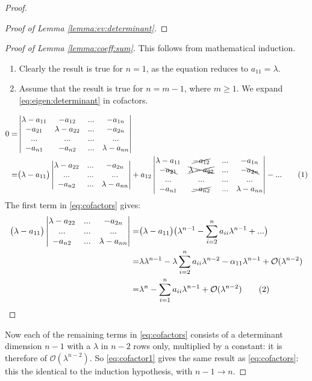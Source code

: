 \documentclass[]{article}
\newcommand\numberthis{\addtocounter{equation}{1}\tag{\theequation}}
\begin{document}
\begin{appendices}
\begin{proof}
\begin{proof}[Proof of Lemma \ref{lemma:ev:determinant}]
		\end{proof}
		\begin{proof}[Proof of Lemma \ref{lemma:coeff:sum}]
			This follows from mathematical induction.
			\begin{enumerate}
				\item Clearly the result is true for $n=1$, as the equation reduces to $a_{11}=\lambda$.
				\item Assume that the result is true for $n=m-1$, where $m\ge 1$. We expand \eqref{eq:eigen:determinant} in cofactors.
			\end{enumerate}
			\begin{align*}
			0=&\begin{vmatrix}
			\lambda-a_{11}&-a_{12}&...&-a_{1n}\\
			-a_{21}&\lambda-a_{22}&...&-a_{2n}\\
			...&...&...&...\\
			-a_{n1}&-a_{n2}&...&\lambda-a_{nn}
			\end{vmatrix}\\=& \big(\lambda-a_{11}\big)\begin{vmatrix}
			\lambda-a_{22}&...&-a_{2n}\\
			...&...&...\\
			-a_{n2}&...&\lambda-a_{nn}
			\end{vmatrix}+a_{12}\begin{vmatrix}
			\lambda-a_{11}&\cancel{-a_{12}}&...&-a_{1n}\\
			-\bcancel{a_{21}}&\xcancel{\lambda-a_{22}}&...&-\bcancel{a_{2n}}\\
			...&...&...&...\\
			-a_{n1}&\cancel{-a_{n2}}&...&\lambda-a_{nn}
			\end{vmatrix} - ... \numberthis \label{eq:cofactors}
			\end{align*}
			The first term in \eqref{eq:cofactors} gives:
			\begin{align*}
			\big(\lambda-a_{11}\big)\begin{vmatrix}
			\lambda-a_{22}&...&-a_{2n}\\
			...&...&...\\
			-a_{n2}&...&\lambda-a_{nn}
			\end{vmatrix}=&	\big(\lambda-a_{11}\big) \big(\lambda^{n-1} - \sum_{i=2}^{n}a_{ii}\lambda^{n-1}+...\big)	\\
			=& \lambda \lambda^{n-1} - \lambda \sum_{i=2}^{n}a_{ii}\lambda^{n-2} - \alpha_{11}\lambda^{n-1} + \mathcal{O}(\lambda^{n-2})\\
			=& \lambda^n - \sum_{i=1}^{n}a_{ii}\lambda^{n-1}+ \mathcal{O}(\lambda^{n-2}) \numberthis \label{eq:cofactor1}
			\end{align*}
		\end{proof}
		Now each of the remaining terms in \eqref{eq:cofactors} consists of a determinant dimension $n-1$ with a $\lambda$ in $n-2$ rows only, multiplied by a constant: it is therefore of $\mathcal{O}(\lambda^{n-2})$. So \eqref{eq:cofactor1} gives the same result as \eqref{eq:cofactors}: this the identical to the induction hypothesis, with $n-1\rightarrow n$.
		

\end{proof}
\end{appendices}
\end{document}
